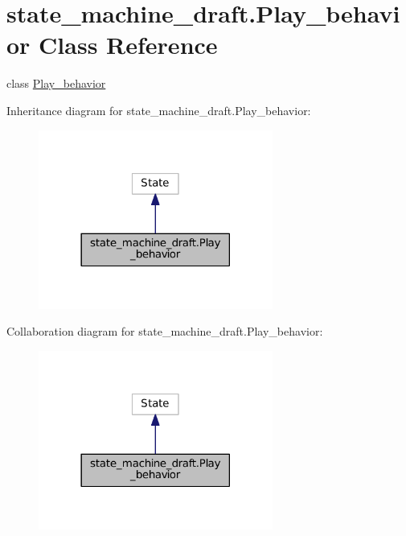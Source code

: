 \hypertarget{classstate__machine__draft_1_1Play__behavior}{}\section{state\+\_\+machine\+\_\+draft.\+Play\+\_\+behavior Class Reference}
\label{classstate__machine__draft_1_1Play__behavior}


class \hyperlink{classstate__machine__draft_1_1Play__behavior}{Play\+\_\+behavior}  




Inheritance diagram for state\+\_\+machine\+\_\+draft.\+Play\+\_\+behavior\+:\nopagebreak
\begin{figure}[H]
\begin{center}
\leavevmode
\includegraphics[width=218pt]{classstate__machine__draft_1_1Play__behavior__inherit__graph}
\end{center}
\end{figure}


Collaboration diagram for state\+\_\+machine\+\_\+draft.\+Play\+\_\+behavior\+:\nopagebreak
\begin{figure}[H]
\begin{center}
\leavevmode
\includegraphics[width=218pt]{classstate__machine__draft_1_1Play__behavior__coll__graph}
\end{center}
\end{figure}
